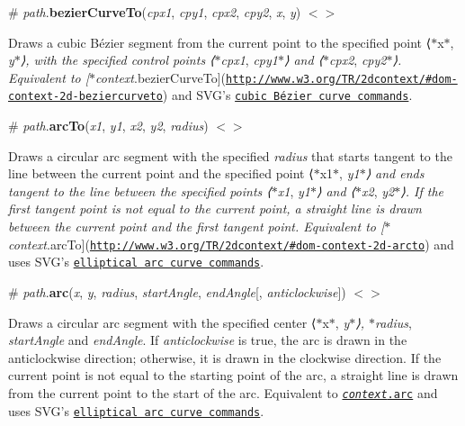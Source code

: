 \label{_path_bezierCurveTo}%
\# {\itshape path}.{\bfseries bezier\+Curve\+To}({\itshape cpx1}, {\itshape cpy1}, {\itshape cpx2}, {\itshape cpy2}, {\itshape x}, {\itshape y}) \href{https://github.com/d3/d3-path/blob/master/src/path.js#L33}{\tt $<$$>$}

Draws a cubic Bézier segment from the current point to the specified point ⟨$\ast$x$\ast$, {\itshape y$\ast$⟩, with the specified control points ⟨$\ast$cpx1}, {\itshape cpy1$\ast$⟩ and ⟨$\ast$cpx2}, {\itshape cpy2$\ast$⟩. Equivalent to \mbox{[}$\ast$context}.bezier\+Curve\+To\mbox{]}(\href{http://www.w3.org/TR/2dcontext/#dom-context-2d-beziercurveto}{\tt http\+://www.\+w3.\+org/\+T\+R/2dcontext/\#dom-\/context-\/2d-\/beziercurveto}) and S\+V\+G’s \href{http://www.w3.org/TR/SVG/paths.html#PathDataCubicBezierCommands}{\tt cubic Bézier curve commands}.

\label{_path_arcTo}%
\# {\itshape path}.{\bfseries arc\+To}({\itshape x1}, {\itshape y1}, {\itshape x2}, {\itshape y2}, {\itshape radius}) \href{https://github.com/d3/d3-path/blob/master/src/path.js#L36}{\tt $<$$>$}

Draws a circular arc segment with the specified {\itshape radius} that starts tangent to the line between the current point and the specified point ⟨$\ast$x1$\ast$, {\itshape y1$\ast$⟩ and ends tangent to the line between the specified points ⟨$\ast$x1}, {\itshape y1$\ast$⟩ and ⟨$\ast$x2}, {\itshape y2$\ast$⟩. If the first tangent point is not equal to the current point, a straight line is drawn between the current point and the first tangent point. Equivalent to \mbox{[}$\ast$context}.arc\+To\mbox{]}(\href{http://www.w3.org/TR/2dcontext/#dom-context-2d-arcto}{\tt http\+://www.\+w3.\+org/\+T\+R/2dcontext/\#dom-\/context-\/2d-\/arcto}) and uses S\+V\+G’s \href{http://www.w3.org/TR/SVG/paths.html#PathDataEllipticalArcCommands}{\tt elliptical arc curve commands}.

\label{_path_arc}%
\# {\itshape path}.{\bfseries arc}({\itshape x}, {\itshape y}, {\itshape radius}, {\itshape start\+Angle}, {\itshape end\+Angle}\mbox{[}, {\itshape anticlockwise}\mbox{]}) \href{https://github.com/d3/d3-path/blob/master/src/path.js#L84}{\tt $<$$>$}

Draws a circular arc segment with the specified center ⟨$\ast$x$\ast$, {\itshape y$\ast$⟩, $\ast$radius}, {\itshape start\+Angle} and {\itshape end\+Angle}. If {\itshape anticlockwise} is true, the arc is drawn in the anticlockwise direction; otherwise, it is drawn in the clockwise direction. If the current point is not equal to the starting point of the arc, a straight line is drawn from the current point to the start of the arc. Equivalent to \href{http://www.w3.org/TR/2dcontext/#dom-context-2d-arc}{\tt {\itshape context}.arc} and uses S\+V\+G’s \href{http://www.w3.org/TR/SVG/paths.html#PathDataEllipticalArcCommands}{\tt elliptical arc curve commands}.


